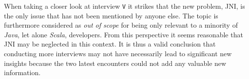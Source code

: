 When taking a closer look at interview \texttt{V} it strikes that the new problem, \ac{JNI}, is the only issue that has not been mentioned by anyone else. The topic is furthermore considered as \textit{out of scope} for being only relevant to a minority of \textit{Java}, let alone \textit{Scala}, developers. From this perspective it seems reasonable that \ac{JNI} may be neglected in this context. It is thus a valid conclusion that conducting more interviews may not have necessarily lead to significant new insights because the two latest encounters could not add any valuable new information.